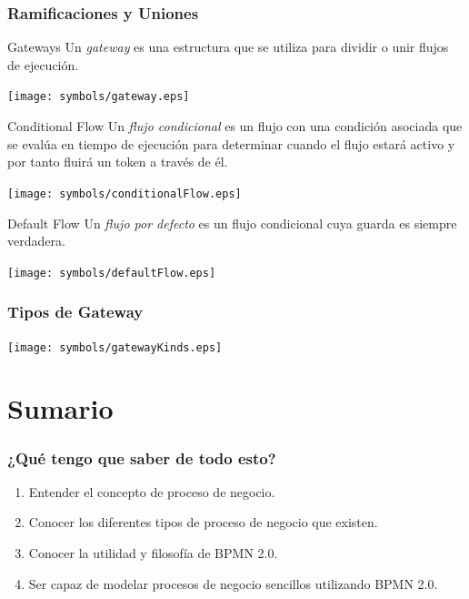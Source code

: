 \documentclass[a4paper,slidestop,xcolor=pst,blue]{beamer}
\begin{document}
\begin{frame}[c]
    \frametitle{Ramificaciones y Uniones}
    \begin{block}{Gateways}
        Un \emph{gateway} es una estructura que se utiliza para dividir o unir flujos de ejecución.
        \ \\
        \begin{center}
            \texttt{[image: symbols/gateway.eps]}
        \end{center}
    \end{block}
    \begin{block}{Conditional Flow}
        Un \emph{flujo condicional} es un flujo con una condición asociada que se evalúa en tiempo de ejecución para determinar cuando el flujo estará activo y por tanto fluirá un token a través de él.
        \ \\
        \begin{center}
            \texttt{[image: symbols/conditionalFlow.eps]}
        \end{center}
    \end{block}
    \begin{block}{Default Flow}
        Un \emph{flujo por defecto} es un flujo condicional cuya guarda es siempre verdadera.
        \ \\
        \begin{center}
            \texttt{[image: symbols/defaultFlow.eps]}
        \end{center}
    \end{block}
\end{frame}

\begin{frame}[c]
    \frametitle{Tipos de Gateway}
    \begin{center}
            \texttt{[image: symbols/gatewayKinds.eps]}
    \end{center}
\end{frame}

\section{Sumario}

\begin{frame}[c]
    \frametitle{¿Qué tengo que saber de todo esto?}
    \begin{enumerate}[<+->]
        \item Entender el concepto de proceso de negocio.
        \item Conocer los diferentes tipos de proceso de negocio que existen.
        \item Conocer la utilidad y filosofía de BPMN 2.0.
        \item Ser capaz de modelar procesos de negocio sencillos utilizando BPMN 2.0.
    \end{enumerate}
\end{frame}
\end{document}
